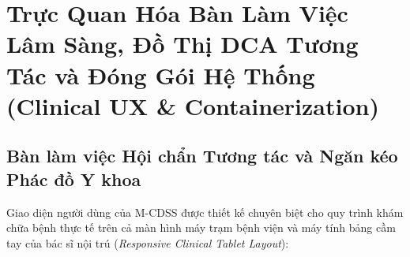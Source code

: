 \section{Trực Quan Hóa Bàn Làm Việc Lâm Sàng, Đồ Thị DCA Tương Tác và Đóng Gói Hệ Thống (Clinical UX \& Containerization)}
\label{sec:frontend_dca_ux}

\subsection{Bàn làm việc Hội chẩn Tương tác và Ngăn kéo Phác đồ Y khoa}
Giao diện người dùng của M-CDSS được thiết kế chuyên biệt cho quy trình khám chữa bệnh thực tế trên cả màn hình máy trạm bệnh viện và máy tính bảng cầm tay của bác sĩ nội trú (\textit{Responsive Clinical Tablet Layout}):

